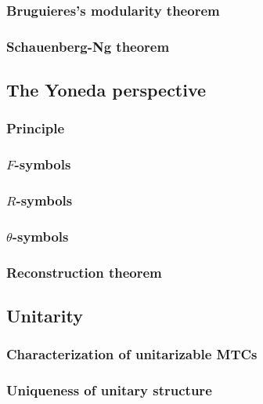 \documentclass{article}
\theoremstyle{definition}
\newcommand{\0}{\left|0\right>}
\newcommand{\1}{\left|1\right>}
\numberwithin{figure}{section}
\begin{document}
\subsubsection{Bruguieres's modularity theorem}

\subsubsection{Schauenberg-Ng theorem}



\subsection{The Yoneda perspective}

\subsubsection{Principle}

\subsubsection{$F$-symbols}

\subsubsection{$R$-symbols}

\subsubsection{$\theta$-symbols}

\subsubsection{Reconstruction theorem}



\subsection{Unitarity}

\subsubsection{Characterization of unitarizable MTCs}

\subsubsection{Uniqueness of unitary structure}
\end{document}
